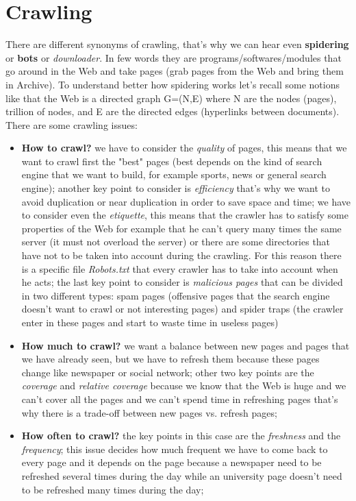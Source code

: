 \section{Crawling}
There are different synonyms of crawling, that's why we can hear even \textbf{spidering} or \textbf{bots} or \textit{downloader}. In few words they are programs/softwares/modules that go around in the Web and take pages (grab pages from the Web and bring them in Archive).\newline
To understand better how spidering works let's recall some notions like that the Web is a directed graph G=(N,E) where N are the nodes (pages), trillion of nodes, and E are the directed edges (hyperlinks between documents).\newline
There are some crawling issues:
\begin{itemize}
    \item \textbf{How to crawl?} we have to consider the \textit{quality} of pages, this means that we want to crawl first the "best" pages (best depends on the kind of search engine that we want to build, for example sports, news or general search engine); another key point to consider is \textit{efficiency} that's why we want to avoid duplication or near duplication in order to save space and time; we have to consider even the \textit{etiquette}, this means that the crawler has to satisfy some properties of the Web for example that he can't query many times the same server (it must not overload the server) or there are some directories that have not to be taken into account during the crawling. For this reason there is a specific file \textit{Robots.txt} that every crawler has to take into account when he acts; the last key point to consider is \textit{malicious pages} that can be divided in two different types: spam pages (offensive pages that the search engine doesn't want to crawl or not interesting pages) and spider traps (the crawler enter in these pages and start to waste time in useless pages)
    \item \textbf{How much to crawl?} we want a balance between new pages and pages that we have already seen, but we have to refresh them because these pages change like newspaper or social network; other two key points are the \textit{coverage} and \textit{relative coverage} because we know that the Web is huge and we can't cover all the pages and we can't spend time in refreshing pages that's why there is a trade-off between new pages vs. refresh pages;
    \item \textbf{How often to crawl?} the key points in this case are the \textit{freshness} and the \textit{frequency}; this issue decides how much frequent we have to come back to every page and it depends on the page because a newspaper need to be refreshed several times during the day while an university page doesn't need to be refreshed many times during the day;
\end{itemize}
